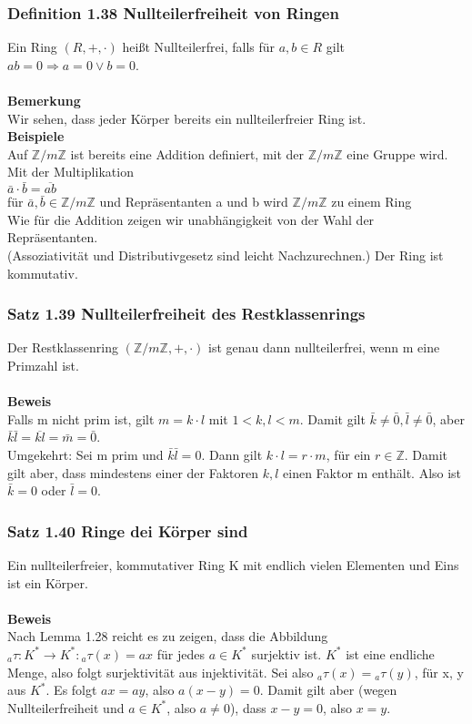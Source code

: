 \documentclass{scrartcl}
\newcommand{\Z}{\mathbb{Z}}
\begin{document}
\subsubsection{Definition 1.38 Nullteilerfreiheit von Ringen}
Ein Ring \((R, +, \cdot)\) hei\ss{}t Nullteilerfrei, falls f\"ur \(a, b \in R\) gilt \(ab = 0 \Rightarrow a = 0 \lor b = 0\).\\
\\
\textbf{Bemerkung}\\
Wir sehen, dass jeder K\"orper bereits ein nullteilerfreier Ring ist.\\
\textbf{Beispiele}\\
Auf \(\Z/m\Z\) ist bereits eine Addition definiert, mit der \(\Z/m\Z\) eine Gruppe wird. Mit der Multiplikation\\
\(\bar{a} \cdot \bar{b} = \overline{ab}\)\\
f\"ur \(\bar{a}, \bar{b} \in \Z / m\Z\) und Repr\"asentanten a und b wird \(\Z/m\Z\) zu einem Ring\\
Wie f\"ur die Addition zeigen wir unabh\"angigkeit von der Wahl der Repr\"asentanten.\\
(Assoziativit\"at und Distributivgesetz sind leicht Nachzurechnen.) Der Ring ist kommutativ.

\subsubsection{Satz 1.39 Nullteilerfreiheit des Restklassenrings}
Der Restklassenring \((\Z/m\Z, +, \cdot)\) ist genau dann nullteilerfrei, wenn m eine Primzahl ist.\\
\\
\textbf{Beweis}\\
Falls m nicht prim ist, gilt \(m = k \cdot l\) mit \(1 < k, l < m\). Damit gilt \(\bar{k} \neq \bar{0}, \bar{l} \neq \bar{0}\), aber \(\bar{k} \bar{l}= \overline{kl} = \bar{m} = \bar{0}\).\\Umgekehrt: Sei m prim und \(\bar{k} \bar{l} = 0\). Dann gilt \(k \cdot l= r \cdot m\), f\"ur ein \(r \in \Z\). Damit gilt aber, dass mindestens einer der Faktoren \(k, l\) einen Faktor m enth\"alt. Also ist \(\bar{k} = 0\) oder \(\bar{l} = 0\).

\subsubsection{Satz 1.40 Ringe dei K\"orper sind}
Ein nullteilerfreier, kommutativer Ring K mit endlich vielen Elementen und Eins ist ein K\"orper.\\
\\
\textbf{Beweis}\\
Nach Lemma 1.28 reicht es zu zeigen, dass die Abbildung \({}_{a}\tau : K^* \to K^* : {}_{a}\tau(x) = ax\) f\"ur jedes \(a \in K^*\) surjektiv ist. \(K^*\) ist eine endliche Menge, also folgt surjektivit\"at aus injektivit\"at. Sei also \({}_a\tau(x) = {}_a\tau(y)\), f\"ur x, y aus \(K^*\). Es folgt \(ax = ay\), also \(a (x - y) = 0\). Damit gilt aber  (wegen Nullteilerfreiheit und \(a \in K^*\), also \(a \neq 0\)), dass \(x - y = 0\), also \(x = y\).
\end{document}
